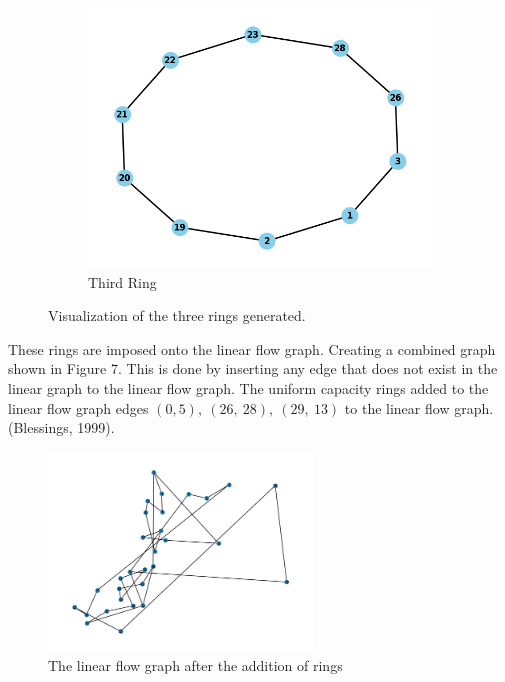\documentclass[11pt]{article}
\begin{document}
\begin{figure}[H]
\begin{subfigure}{0.32\textwidth}
        \includegraphics[width=\linewidth]{ring3.png}
        \caption{Third Ring}
        \label{fig:ring3}
    \end{subfigure}
    \caption{Visualization of the three rings generated.}
    \label{fig:rings}
\end{figure}
	These rings are imposed onto the linear flow graph. Creating a combined graph shown in Figure 7.  This is done by inserting any edge that does not exist in the linear graph to the linear flow graph. The uniform capacity rings added to the linear flow graph edges $\left(0,5\right),\ \left(26,\ 28\right),\ \left(29,\ 13\right)$ to the linear flow graph.  (Blessings, 1999). \par
\begin{figure}[H]
\centering
\includegraphics[height=200px]{combined.png}
\caption{The linear flow graph after the addition of rings}
\end{figure}
\end{document}

